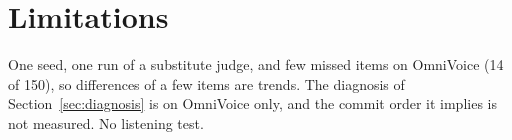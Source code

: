 \documentclass[11pt]{article}
\begin{document}
\section*{Limitations}
One seed, one run of a substitute judge, and few missed items on OmniVoice (14 of 150), so differences of a few items are trends. The diagnosis of Section~\ref{sec:diagnosis} is on OmniVoice only, and the commit order it implies is not measured. No listening test.


\end{document}
